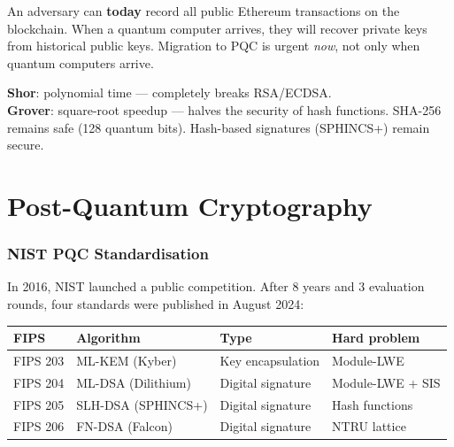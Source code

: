 \documentclass[11pt,a4paper]{article}
\begin{document}
\begin{warningbox}
An adversary can \textbf{today} record all public Ethereum transactions on the blockchain. When a quantum computer arrives, they will recover private keys from historical public keys. Migration to PQC is urgent \emph{now}, not only when quantum computers arrive.
\end{warningbox}

\begin{infobox}
\textbf{Shor}: polynomial time --- completely breaks RSA/ECDSA.\\
\textbf{Grover}: square-root speedup --- halves the security of hash functions. SHA-256 remains safe (128 quantum bits). Hash-based signatures (SPHINCS+) remain secure.
\end{infobox}

\newpage
\part{Post-Quantum Cryptography}

\section{NIST PQC Standardisation}

In 2016, NIST launched a public competition. After 8 years and 3 evaluation rounds, four standards were published in August 2024:

\begin{center}
\begin{tabular}{llll}
\toprule
\textbf{FIPS} & \textbf{Algorithm} & \textbf{Type} & \textbf{Hard problem} \\
\midrule
FIPS 203 & ML-KEM (Kyber)     & Key encapsulation  & Module-LWE \\
FIPS 204 & ML-DSA (Dilithium) & Digital signature  & Module-LWE + SIS \\
FIPS 205 & SLH-DSA (SPHINCS+) & Digital signature  & Hash functions \\
FIPS 206 & FN-DSA (Falcon)    & Digital signature  & NTRU lattice \\
\bottomrule
\end{tabular}
\end{center}
\end{document}
